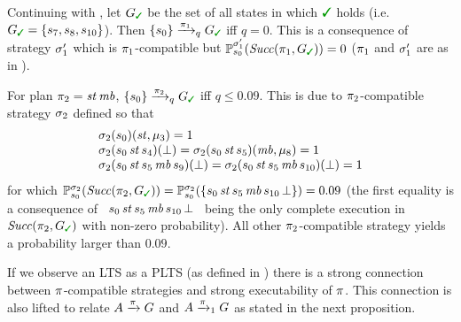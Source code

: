 \begin{example}
  Continuing with , let
  $G_{\goal}$
  be the set of all states in which $\goal$ holds (i.e. $G_{\goal} = \{s_7, s_8, s_{10}\}$).
  Then $\{s_0\}\reach{\plan_1}_qG_{\goal}$ iff $q=0$.  This
  is a consequence of strategy $\sigma'_1$ which is
  $\pi_1$-compatible but
  $\Prob^{\strat'_1}_{s_0}(\Succ(\plan_1,G_{\goal}))=0$ ($\pi_1$ and
  $\sigma'_1$ are as in ).

  For plan $\pi_2 = \mathit{st}\,\mathit{mb}$,
  $\{s_0\}\reach{\plan_2}_qG_{\goal}$ iff $q\leq0.09$.  This is due to
  $\pi_2$-compatible strategy $\sigma_2$ defined so that
  \[
  \begin{array}{l}
    \sigma_2(s_0)(\mathit{st},\mu_3)=1\\
    \sigma_2(s_0\,\mathit{st}\,s_4)(\bot)=
    \sigma_2(s_0\,\mathit{st}\,s_5)(\mathit{mb},\mu_8)=1\\
    \sigma_2(s_0\,\mathit{st}\,s_5\,\mathit{mb}\,s_9)(\bot)=
    \sigma_2(s_0\,\mathit{st}\,s_5\,\mathit{mb}\,s_{10})(\bot)=1
  \end{array}
  \]
  for which
  $\Prob^{\strat_2}_{s_0}(\Succ(\plan_2,G_{\goal}))=\Prob^{\strat_2}_{s_0}(\{s_0\,\stairs\,s_5\,\mobile\,s_{10}\,\complete\})=0.09$
  (the first equality is a consequence of \
  $s_0\,\mathit{st}\,s_5\,\mathit{mb}\,s_{10}\,\bot$ \ being the only
  complete execution in $\Succ(\plan_2,G_{\goal})$ with non-zero
  probability).
  All other $\pi_2$-compatible strategy yields a probability larger
  than $0.09$.
  
\end{example}

If we observe an LTS as a PLTS (as defined in
) there is a strong connection between
$\pi$-compatible strategies and strong executability of $\pi$.
This connection is also lifted to relate $A \xrightarrow{\pi} G$ and $A
\xrightarrow{\pi}_1 G$ as stated in the next proposition.


